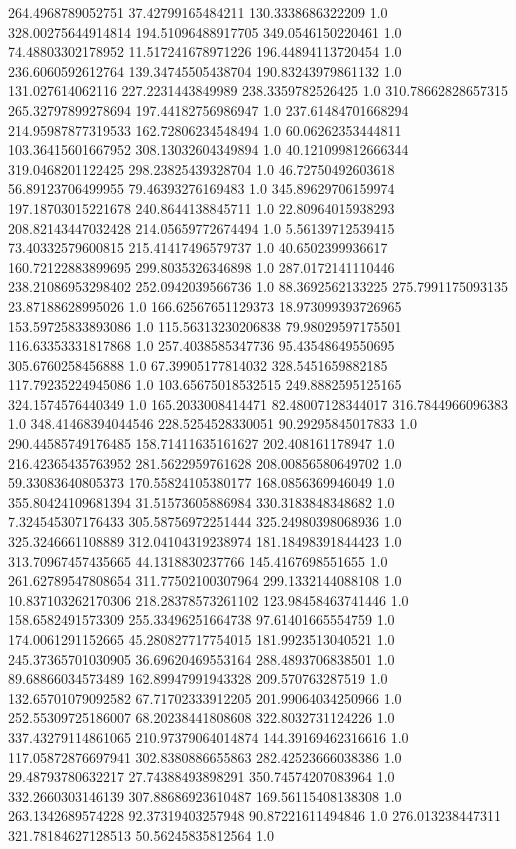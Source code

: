264.4968789052751	37.42799165484211	130.3338686322209	1.0
328.00275644914814	194.51096488917705	349.0546150220461	1.0
74.48803302178952	11.517241678971226	196.44894113720454	1.0
236.6060592612764	139.34745505438704	190.83243979861132	1.0
131.027614062116	227.2231443849989	238.3359782526425	1.0
310.78662828657315	265.32797899278694	197.44182756986947	1.0
237.61484701668294	214.95987877319533	162.72806234548494	1.0
60.06262353444811	103.36415601667952	308.13032604349894	1.0
40.121099812666344	319.0468201122425	298.23825439328704	1.0
46.72750492603618	56.89123706499955	79.46393276169483	1.0
345.89629706159974	197.18703015221678	240.8644138845711	1.0
22.80964015938293	208.82143447032428	214.05659772674494	1.0
5.56139712539415	73.40332579600815	215.41417496579737	1.0
40.6502399936617	160.72122883899695	299.8035326346898	1.0
287.0172141110446	238.21086953298402	252.0942039566736	1.0
88.3692562133225	275.7991175093135	23.87188628995026	1.0
166.62567651129373	18.973099393726965	153.59725833893086	1.0
115.56313230206838	79.98029597175501	116.63353331817868	1.0
257.4038585347736	95.43548649550695	305.6760258456888	1.0
67.39905177814032	328.5451659882185	117.79235224945086	1.0
103.65675018532515	249.8882595125165	324.1574576440349	1.0
165.2033008414471	82.48007128344017	316.7844966096383	1.0
348.41468394044546	228.5254528330051	90.29295845017833	1.0
290.44585749176485	158.71411635161627	202.408161178947	1.0
216.42365435763952	281.5622959761628	208.00856580649702	1.0
59.33083640805373	170.55824105380177	168.0856369946049	1.0
355.80424109681394	31.51573605886984	330.3183848348682	1.0
7.324545307176433	305.58756972251444	325.24980398068936	1.0
325.3246661108889	312.04104319238974	181.18498391844423	1.0
313.70967457435665	44.1318830237766	145.4167698551655	1.0
261.62789547808654	311.77502100307964	299.1332144088108	1.0
10.837103262170306	218.28378573261102	123.98458463741446	1.0
158.6582491573309	255.33496251664738	97.61401665554759	1.0
174.0061291152665	45.280827717754015	181.9923513040521	1.0
245.37365701030905	36.69620469553164	288.4893706838501	1.0
89.68866034573489	162.89947991943328	209.570763287519	1.0
132.65701079092582	67.71702333912205	201.99064034250966	1.0
252.55309725186007	68.20238441808608	322.8032731124226	1.0
337.43279114861065	210.97379064014874	144.39169462316616	1.0
117.05872876697941	302.8380886655863	282.42523666038386	1.0
29.48793780632217	27.74388493898291	350.74574207083964	1.0
332.2660303146139	307.88686923610487	169.56115408138308	1.0
263.1342689574228	92.37319403257948	90.87221611494846	1.0
276.013238447311	321.78184627128513	50.56245835812564	1.0
